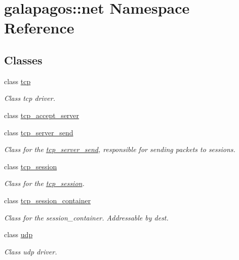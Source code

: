 \hypertarget{namespacegalapagos_1_1net}{}\section{galapagos\+:\+:net Namespace Reference}
\label{namespacegalapagos_1_1net}
\subsection*{Classes}
\begin{DoxyCompactItemize}
\item 
class \hyperlink{classgalapagos_1_1net_1_1tcp}{tcp}
\begin{DoxyCompactList}\small\item\em Class tcp driver. \end{DoxyCompactList}\item 
class \hyperlink{classgalapagos_1_1net_1_1tcp__accept__server}{tcp\+\_\+accept\+\_\+server}
\item 
class \hyperlink{classgalapagos_1_1net_1_1tcp__server__send}{tcp\+\_\+server\+\_\+send}
\begin{DoxyCompactList}\small\item\em Class for the \hyperlink{classgalapagos_1_1net_1_1tcp__server__send}{tcp\+\_\+server\+\_\+send}, responsible for sending packets to sessions. \end{DoxyCompactList}\item 
class \hyperlink{classgalapagos_1_1net_1_1tcp__session}{tcp\+\_\+session}
\begin{DoxyCompactList}\small\item\em Class for the \hyperlink{classgalapagos_1_1net_1_1tcp__session}{tcp\+\_\+session}. \end{DoxyCompactList}\item 
class \hyperlink{classgalapagos_1_1net_1_1tcp__session__container}{tcp\+\_\+session\+\_\+container}
\begin{DoxyCompactList}\small\item\em Class for the session\+\_\+container. Addressable by dest. \end{DoxyCompactList}\item 
class \hyperlink{classgalapagos_1_1net_1_1udp}{udp}
\begin{DoxyCompactList}\small\item\em Class udp driver. \end{DoxyCompactList}\end{DoxyCompactItemize}
